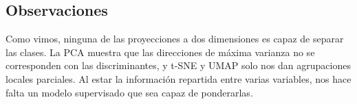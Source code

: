 \subsection{Observaciones}

Como vimos, ninguna de las proyecciones a dos dimensiones es capaz de separar las clases. La PCA muestra que las direcciones de máxima varianza no se corresponden con las discriminantes, y t-SNE y UMAP solo nos dan agrupaciones locales parciales. Al estar la información repartida entre varias variables, nos hace falta un modelo supervisado que sea capaz de ponderarlas.
